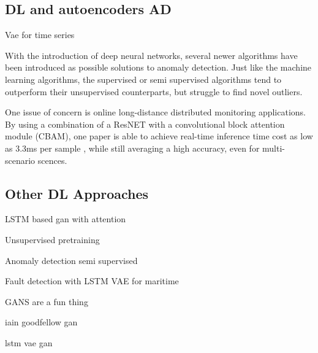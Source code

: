 \subsection{DL and autoencoders AD}


Vae for time series \cite{desai2021timevae}

With the introduction of deep neural networks, several newer algorithms have been introduced as possible solutions to anomaly detection. Just like the machine learning algorithms, the supervised or semi supervised algorithms tend to outperform their unsupervised counterparts, but struggle to find novel outliers. 



One issue of concern is online long-distance distributed monitoring applications. By using a combination of a ResNET with a convolutional block attention module (CBAM), one paper is able to achieve real-time inference time cost as low as 3.3ms per sample \cite{photonics9100677}, while still averaging a high accuracy, even for multi-scenario scences. 


\subsection{Other DL Approaches}


LSTM based gan with attention \cite{bashar2023algan} 

Unsupervised pretraining \cite{alaaDeepLstm2019}

Anomaly detection semi supervised \cite{huang2021esad}

Fault detection with LSTM VAE for maritime \cite{9514856} 

GANS are a fun thing \cite{jiang2023unsupervised}

iain goodfellow gan \cite{goodfellow2016nips}

lstm vae gan \cite{s20133738}



